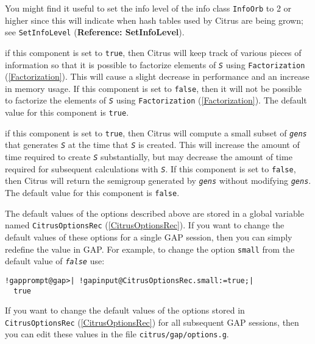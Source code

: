 \documentclass[a4paper,11pt]{report}
\begin{document}
{{\begin{description}
 You might find it useful to set the info level of the info class \texttt{InfoOrb} to 2 or higher since this will indicate when hash tables used by \textsf{Citrus} are being grown; see \texttt{SetInfoLevel} (\textbf{Reference: SetInfoLevel}). 
\item[{\texttt{schreier}}]  if this component is set to \texttt{true}, then \textsf{Citrus} will keep track of various pieces of information so that it is possible to
factorize elements of \mbox{\texttt{\mdseries\slshape S}} using \texttt{Factorization} (\ref{Factorization}). This will cause a slight decrease in performance and an increase in memory
usage. If this component is set to \texttt{false}, then it will not be possible to factorize the elements of \mbox{\texttt{\mdseries\slshape S}} using \texttt{Factorization} (\ref{Factorization}). The default value for this component is \texttt{true}. 
\item[{\texttt{small}}] if this component is set to \texttt{true}, then \textsf{Citrus} will compute a small subset of \mbox{\texttt{\mdseries\slshape gens}} that generates \mbox{\texttt{\mdseries\slshape S}} at the time that \mbox{\texttt{\mdseries\slshape S}} is created. This will increase the amount of time required to create \mbox{\texttt{\mdseries\slshape S}} substantially, but may decrease the amount of time required for subsequent
calculations with \mbox{\texttt{\mdseries\slshape S}}. If this component is set to \texttt{false}, then \textsf{Citrus} will return the semigroup generated by \mbox{\texttt{\mdseries\slshape gens}} without modifying \mbox{\texttt{\mdseries\slshape gens}}. The default value for this component is \texttt{false}. 
\end{description}
 The default values of the options described above are stored in a global
variable named \texttt{CitrusOptionsRec} (\ref{CitrusOptionsRec}). If you want to change the default values of these options for a single \textsf{GAP} session, then you can simply redefine the value in \textsf{GAP}. For example, to change the option \texttt{small} from the default value of \mbox{\texttt{\mdseries\slshape false}} use: 
\begin{Verbatim}[commandchars=!@|,fontsize=\small,frame=single,label=Example]
  !gapprompt@gap>| !gapinput@CitrusOptionsRec.small:=true;|
  true
\end{Verbatim}
 If you want to change the default values of the options stored in \texttt{CitrusOptionsRec} (\ref{CitrusOptionsRec}) for all subsequent \textsf{GAP} sessions, then you can edit these values in the file \texttt{citrus/gap/options.g}. 

}}
\end{document}
